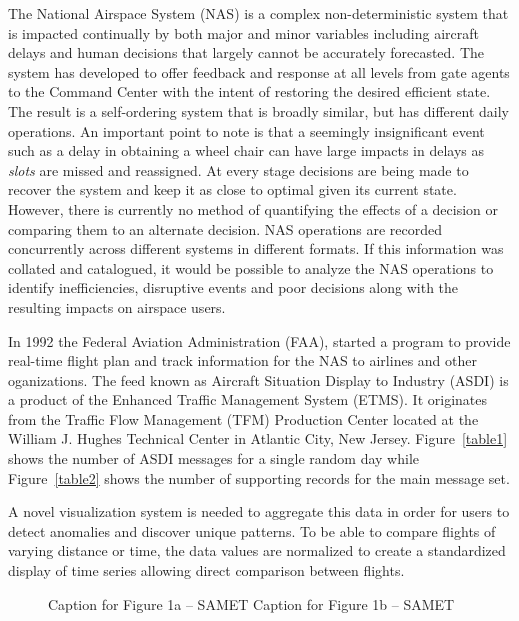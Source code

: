 \documentclass{sig-alternate}
\begin{document}
The National Airspace System (NAS) is a complex non-deterministic system that
is impacted continually by both major and minor variables including aircraft
delays and human decisions that largely cannot be accurately forecasted.
The system has developed to offer feedback and response at all levels from
gate agents to the Command Center with the intent of restoring the desired
efficient state. The result is a self-ordering system that is broadly
similar, but has different daily operations. An important point to note is that
a seemingly insignificant event such as
a delay in obtaining a wheel chair can have large impacts in delays
as \emph{slots} are missed and reassigned. At every stage decisions are being
made to recover the system and keep it as close to optimal given its current
state. However, there is currently no method of quantifying the effects of 
a decision or comparing them to an alternate decision. NAS operations
are recorded concurrently across different systems in different formats.
If this information was collated and catalogued, it would be possible
to analyze the NAS operations to identify inefficiencies, disruptive events 
and poor decisions along with the resulting impacts on airspace users.

In 1992 the Federal Aviation Administration (FAA), started a program to provide
real-time flight plan and track information for the NAS to airlines and other
oganizations. The feed known as Aircraft Situation Display to Industry (ASDI) is a 
product of the Enhanced Traffic Management System (ETMS). It originates from
the Traffic Flow Management (TFM) Production Center located at the William
J. Hughes Technical Center in Atlantic City, New Jersey. Figure~\ref{table1} shows the 
number of ASDI messages for a single random day while Figure~\ref{table2} shows the number
of supporting records for the main message set.


A novel visualization system is needed to aggregate this data in order for 
users to detect anomalies and discover unique patterns. To be able to compare 
flights of varying distance or time, the data values are normalized to 
create a standardized display of time series allowing direct comparison between
flights. 

\newcommand{\incfig}[2]{\texttt{[image: figs/\#1]}\label{#1}}

\begin{figure}
\centering
\subfloat[]{\incfig{table1}{width=1\columnwidth}}\hfill
\subfloat[]{\incfig{table2}{width=1\columnwidth}}
\caption{
 Caption for Figure 1a -- SAMET 
  Caption for Figure 1b -- SAMET
}
\label{two-tables}
\end{figure}
\end{document}
